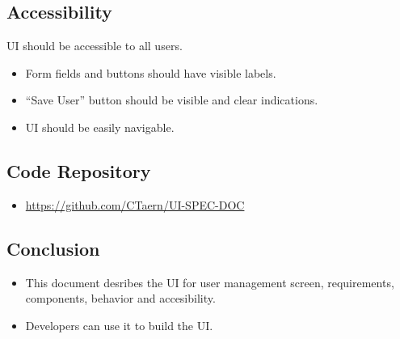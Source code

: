 \documentclass[
]{article}
\providecommand{\tightlist}{%
  \setlength{\itemsep}{0pt}\setlength{\parskip}{0pt}}
\begin{document}
\hypertarget{accessibility}{%
\subsection{Accessibility}\label{accessibility}}

UI should be accessible to all users.

\begin{itemize}
\item
  Form fields and buttons should have visible labels.
\item
  ``Save User'' button should be visible and clear indications.
\item
  UI should be easily navigable.
\end{itemize}

\hypertarget{code-repository}{%
\subsection{Code Repository}\label{code-repository}}

\begin{itemize}
\tightlist
\item
  \url{https://github.com/CTaern/UI-SPEC-DOC}
\end{itemize}

\hypertarget{conclusion}{%
\subsection{Conclusion}\label{conclusion}}

\begin{itemize}
\item
  This document desribes the UI for user management screen,
  requirements, components, behavior and accesibility.
\item
  Developers can use it to build the UI.
\end{itemize}
\end{document}

